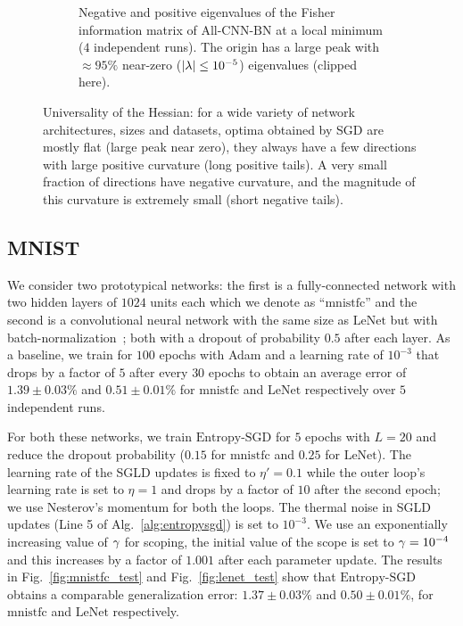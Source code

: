 \documentclass[10pt]{article}
\newcommand{\entropysgd}{\mathrm{Entropy}\textrm{-}\mathrm{SGD}}
\newcommand{\mnistfc}{\textrm{mnistfc}}
\newcommand{\lenet}{\textrm{LeNet}}
\newcommand{\allcnn}{\textrm{All-CNN-BN}}
\begin{document}
\begin{figure}[!tbh]
\begin{subfigure}[b]{\textwidth}
\begin{subfigure}[b]{0.4 \textwidth}
        \end{subfigure}
    \caption{\small Negative and positive eigenvalues of the Fisher information matrix of $\allcnn$ at a local minimum ($4$ independent runs). The origin has a large peak with $\approx 95\%$ near-zero ($\left| \lambda \right| \leq 10^{-5}$) eigenvalues (clipped here).}
    \label{fig:allcnn_hessian}
    \end{subfigure}
\caption{\small Universality of the Hessian: for a wide variety of network architectures, sizes and datasets, optima obtained by SGD are mostly flat (large peak near zero), they always have a few directions with large positive curvature (long positive tails). A very small fraction of directions have negative curvature, and the magnitude of this curvature is extremely small (short negative tails).}
\label{fig:universality}
\end{figure}

\subsection{MNIST}
\label{ss:expt:mnist}

We consider two prototypical networks: the first is a fully-connected network with two hidden layers of $1024$ units each which we denote as ``$\mnistfc$'' and the second is a convolutional neural network with the same size as $\lenet$ but with batch-normalization~\citep{ioffe2015batch}; both with a dropout of probability $0.5$ after each layer. As a baseline, we train for $100$ epochs with Adam and a learning rate of $10^{-3}$ that drops by a factor of $5$ after every $30$ epochs to obtain an average error of $1.39 \pm 0.03\%$ and $0.51 \pm 0.01 \%$ for $\mnistfc$ and $\lenet$ respectively over $5$ independent runs.

For both these networks, we train $\entropysgd$ for $5$ epochs with $L = 20$ and reduce the dropout probability ($0.15$ for $\mnistfc$ and $0.25$ for $\lenet$). The learning rate of the SGLD updates is fixed to $\eta' = 0.1$ while the outer loop's learning rate is set to $\eta=1$ and drops by a factor of $10$ after the second epoch; we use Nesterov's momentum for both the loops. The thermal noise in SGLD updates (Line 5 of Alg.~\ref{alg:entropysgd}) is set to $10^{-3}$. We use an exponentially increasing value of $\gamma$ for scoping, the initial value of the scope is set to $\gamma = 10^{-4}$ and this increases by a factor of $1.001$ after each parameter update. The results in Fig.~\ref{fig:mnistfc_test} and Fig.~\ref{fig:lenet_test} show that $\entropysgd$ obtains a comparable generalization error: $1.37 \pm 0.03 \%$ and $0.50 \pm 0.01 \%$, for $\mnistfc$ and $\lenet$ respectively.
\end{document}
